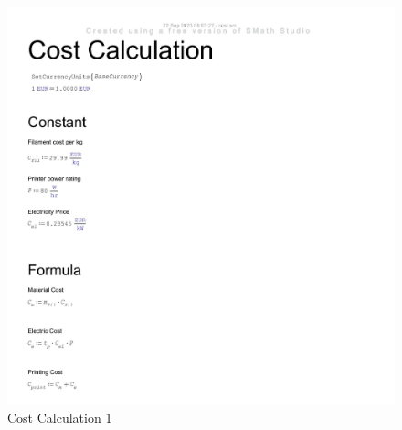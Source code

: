 \begin{figure}[H]
    \centering
    \includegraphics[width=\linewidth]{texs/appendix/data/costcalculation/cost1-01.jpg}
    \caption{Cost Calculation 1}
    \label{fig:cost-calculation-1}
\end{figure}

